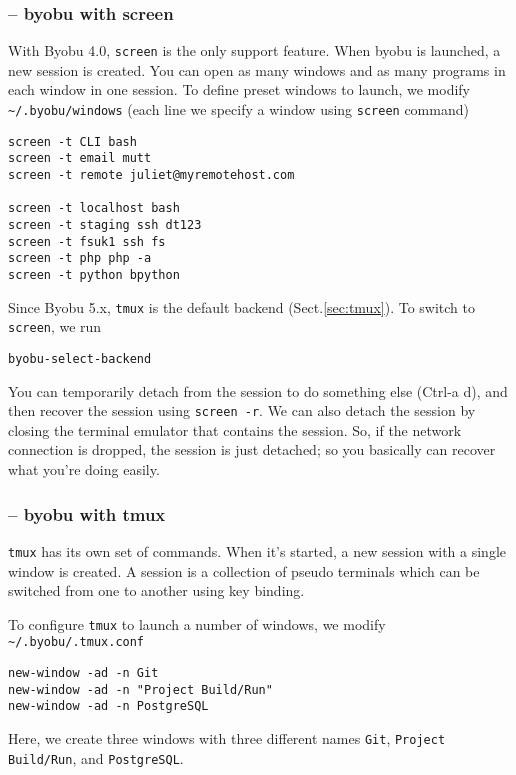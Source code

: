 \subsubsection{-- byobu with screen}
\label{sec:byobu-screen}

With Byobu 4.0, \verb!screen! is the only support feature. When byobu is
launched, a new session is created. You can open as many windows and as many
programs in each window in one session. To define preset windows to launch, we
modify \verb!~/.byobu/windows! (each line we specify a window using
\verb!screen! command)
\begin{verbatim}
screen -t CLI bash
screen -t email mutt
screen -t remote juliet@myremotehost.com

screen -t localhost bash
screen -t staging ssh dt123
screen -t fsuk1 ssh fs
screen -t php php -a
screen -t python bpython
\end{verbatim}
Since Byobu 5.x, \verb!tmux! is the default backend (Sect.\ref{sec:tmux}). To
switch to \verb!screen!, we run
\begin{verbatim}
byobu-select-backend
\end{verbatim}


You can temporarily detach from the session to do something else (Ctrl-a d), and
then recover the session using \verb!screen -r!. We can also detach the session
by closing the terminal emulator that contains the session. So, if the network
connection is dropped, the session is just detached; so you basically can
recover what you're doing easily.


\subsubsection{-- byobu with tmux}
\label{sec:byobu-tmux}

\verb!tmux! has its own set of commands. When it's started, a new session
with a single window is created. A session is a collection of pseudo terminals
which can be switched from one to another using key binding.

To configure \verb!tmux! to launch a number of windows, we modify
\verb!~/.byobu/.tmux.conf!
\begin{verbatim}
new-window -ad -n Git
new-window -ad -n "Project Build/Run"
new-window -ad -n PostgreSQL
\end{verbatim}
Here, we create three windows with three different names \verb!Git!,
\verb!Project Build/Run!, and \verb!PostgreSQL!.

